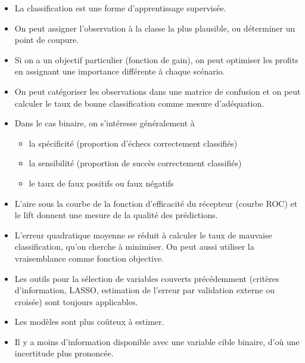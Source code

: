 \documentclass[
  11pt,
  letterpaper,
]{scrbook}
\providecommand{\tightlist}{%
  \setlength{\itemsep}{0pt}\setlength{\parskip}{0pt}}\usepackage{longtable,booktabs,array}
\theoremstyle{definition}
\theoremstyle{remark}
\begin{document}
\begin{tcolorbox}[enhanced jigsaw, titlerule=0mm, rightrule=.15mm, leftrule=.75mm, toprule=.15mm, bottomrule=.15mm, title=\textcolor{quarto-callout-note-color}{\faInfo}\hspace{0.5em}{En résumé}, colbacktitle=quarto-callout-note-color!10!white, opacitybacktitle=0.6, bottomtitle=1mm, coltitle=black, colback=white, breakable, toptitle=1mm, opacityback=0, colframe=quarto-callout-note-color-frame, left=2mm, arc=.35mm]

\begin{itemize}
\tightlist
\item
  La classification est une forme d'apprentissage supervisée.
\item
  On peut assigner l'observation à la classe la plus plausible, ou
  déterminer un point de coupure.
\item
  Si on a un objectif particulier (fonction de gain), on peut optimiser
  les profits en assignant une importance différente à chaque scénario.
\item
  On peut catégoriser les observations dans une matrice de confusion et
  on peut calculer le taux de bonne classification comme mesure
  d'adéquation.
\item
  Dans le cas binaire, on s'intéresse généralement à

  \begin{itemize}
  \tightlist
  \item
    la spécificité (proportion d'échecs correctement classifiés)
  \item
    la sensibilité (proportion de succès correctement classifiés)
  \item
    le taux de faux positifs ou faux négatifs
  \end{itemize}
\item
  L'aire sous la courbe de la fonction d'efficacité du récepteur (courbe
  ROC) et le lift donnent une mesure de la qualité des prédictions.
\item
  L'erreur quadratique moyenne se réduit à calculer le taux de mauvaise
  classification, qu'on cherche à minimiser. On peut aussi utiliser la
  vraisemblance comme fonction objective.
\item
  Les outils pour la sélection de variables couverts précédemment
  (critères d'information, LASSO, estimation de l'erreur par validation
  externe ou croisée) sont toujours applicables.
\item
  Les modèles sont plus coûteux à estimer.
\item
  Il y a moins d'information disponible avec une variable cible binaire,
  d'où une incertitude plus prononcée.
\end{itemize}

\end{tcolorbox}
\end{document}
